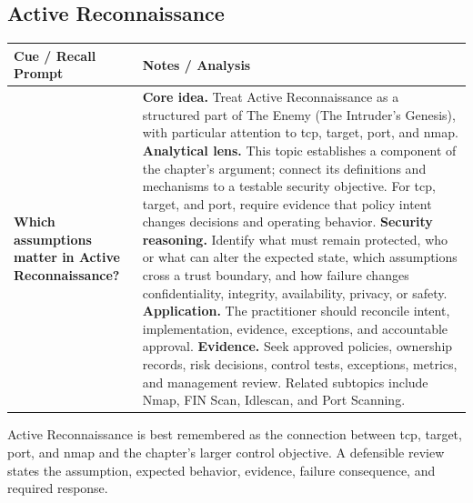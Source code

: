 \documentclass[11pt]{article}
\newcommand{\CornellHeader}{%
\rowcolor{Navy}\color{white}\bfseries Cue / Recall Prompt & \color{white}\bfseries Notes / Analysis\\\hline}
\newcommand{\CornellRow}[2]{%
\cellcolor{CueGray}\RaggedRight\textbf{#1} & \RaggedRight #2\\\hline}
\begin{document}
\subsection*{Active Reconnaissance}
\begin{longtable}{>{\RaggedRight\arraybackslash}p{}|>{\RaggedRight\arraybackslash}p{}}
\CornellHeader
\CornellRow{Which assumptions matter in Active Reconnaissance?}{\textbf{Core idea.} Treat Active Reconnaissance as a structured part of The Enemy (The Intruder's Genesis), with particular attention to tcp, target, port, and nmap. \textbf{Analytical lens.} This topic establishes a component of the chapter's argument; connect its definitions and mechanisms to a testable security objective. For tcp, target, and port, require evidence that policy intent changes decisions and operating behavior. \textbf{Security reasoning.} Identify what must remain protected, who or what can alter the expected state, which assumptions cross a trust boundary, and how failure changes confidentiality, integrity, availability, privacy, or safety. \textbf{Application.} The practitioner should reconcile intent, implementation, evidence, exceptions, and accountable approval. \textbf{Evidence.} Seek approved policies, ownership records, risk decisions, control tests, exceptions, metrics, and management review. Related subtopics include Nmap, FIN Scan, Idlescan, and Port Scanning.}
\end{longtable}
\begin{topicsummary}
Active Reconnaissance is best remembered as the connection between tcp, target, port, and nmap and the chapter's larger control objective. A defensible review states the assumption, expected behavior, evidence, failure consequence, and required response.
\end{topicsummary}
\end{document}

